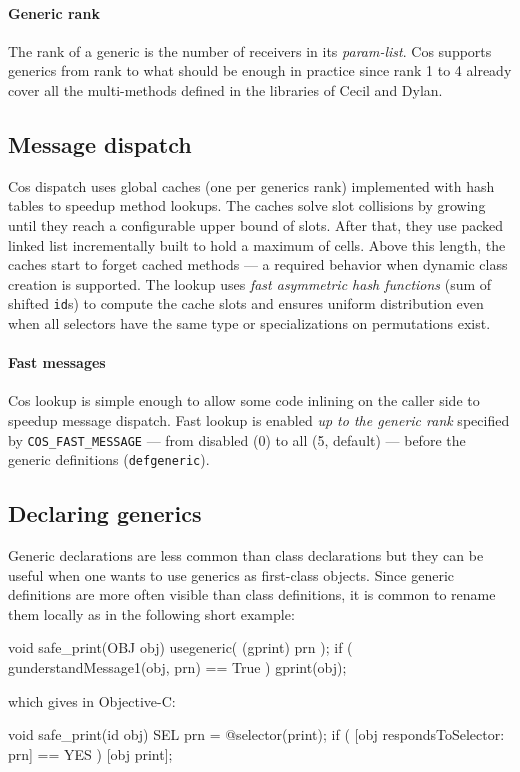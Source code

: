 \documentclass[preprint,10pt]{sigplanconf}
\newcommand{\ProgLang}[1]{{\sc #1}\xspace}
\newcommand{\Cecil}     {\ProgLang{Cecil}}
\newcommand{\Cos}       {\ProgLang{Cos}}
\newcommand{\Dylan}     {\ProgLang{Dylan}}
\newcommand{\Objc}      {\ProgLang{Objective-C}}
\newcommand{\code}[1]{\lstinline[language=COS,style=samplecode]|#1|}
\begin{document}
\paragraph{Generic rank}

The rank of a generic is the number of receivers in its {\em param-list}. \Cos supports generics from rank  to  what should be enough in practice since rank 1 to 4 already cover all the multi-methods defined in the libraries of \Cecil and \Dylan \cite{duj98,zib02,cecil04}.

\subsection{Message dispatch}

\Cos dispatch uses global caches (one per generics rank) implemented with hash tables to speedup method lookups. The caches solve slot collisions by growing until they reach a configurable upper bound of slots. After that, they use packed linked list incrementally built to hold a maximum of  cells. Above this length, the caches start to forget cached methods --- a required behavior when dynamic class creation is supported. The lookup uses {\em fast asymmetric hash functions} (sum of shifted \code{id}s) to compute the cache slots and ensures uniform distribution even when all selectors have the same type or specializations on permutations exist.







\paragraph{Fast messages}

\Cos lookup is simple enough to allow some code inlining on the caller side to speedup message dispatch. Fast lookup is enabled {\em up to the generic rank} specified by \code{COS_FAST_MESSAGE} --- from disabled (0) to all (5, default) --- before the generic definitions (\code{defgeneric}).

\subsection{Declaring generics}

Generic declarations are less common than class declarations but they can be useful when one wants to use generics as first-class objects. Since generic definitions are more often visible than class definitions, it is common to rename them locally as in the following short example:
\begin{COS}
void safe_print(OBJ obj) {
  usegeneric( (gprint) prn );
  if ( gunderstandMessage1(obj, prn) == True )
    gprint(obj);
}
\end{COS}
which gives in \Objc:
\begin{OBJC}
void safe_print(id obj) {
  SEL prn = @selector(print);
  if ( [obj respondsToSelector: prn] == YES )
    [obj print];
}
\end{OBJC}
\end{document}
